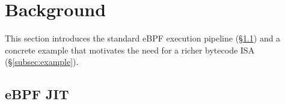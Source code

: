 











\section{Background}
\label{sec:background}

This section introduces the standard eBPF execution pipeline (§\ref{subsec:ebpf-jit}) and a concrete example that motivates the need for a richer bytecode ISA (§\ref{subsec:example}).

\subsection{eBPF JIT}
\label{subsec:ebpf-jit}

